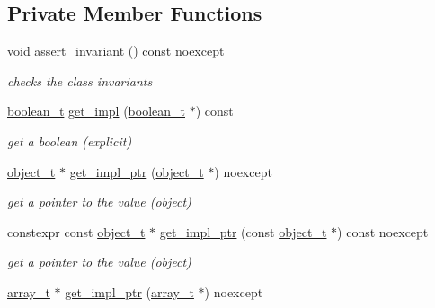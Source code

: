 \subsection*{Private Member Functions}
\begin{DoxyCompactItemize}
\item 
void \hyperlink{classnlohmann_1_1basic__json_a4a82d3fb7a111641decf35c2fb707c7f}{assert\+\_\+invariant} () const noexcept
\begin{DoxyCompactList}\small\item\em checks the class invariants \end{DoxyCompactList}\item 
\hyperlink{classnlohmann_1_1basic__json_a4c919102a9b4fe0d588af64801436082}{boolean\+\_\+t} \hyperlink{classnlohmann_1_1basic__json_ac686d87a2261f85f1df97035b14a6e3a}{get\+\_\+impl} (\hyperlink{classnlohmann_1_1basic__json_a4c919102a9b4fe0d588af64801436082}{boolean\+\_\+t} $\ast$) const
\begin{DoxyCompactList}\small\item\em get a boolean (explicit) \end{DoxyCompactList}\item 
\hyperlink{classnlohmann_1_1basic__json_a5e48a7893520e1314bf0c9723e26ea2a}{object\+\_\+t} $\ast$ \hyperlink{classnlohmann_1_1basic__json_a58b65f595883fb93333423ec5e3bafee}{get\+\_\+impl\+\_\+ptr} (\hyperlink{classnlohmann_1_1basic__json_a5e48a7893520e1314bf0c9723e26ea2a}{object\+\_\+t} $\ast$) noexcept
\begin{DoxyCompactList}\small\item\em get a pointer to the value (object) \end{DoxyCompactList}\item 
constexpr const \hyperlink{classnlohmann_1_1basic__json_a5e48a7893520e1314bf0c9723e26ea2a}{object\+\_\+t} $\ast$ \hyperlink{classnlohmann_1_1basic__json_aff66aa31ef8603d799433b26fe7535c9}{get\+\_\+impl\+\_\+ptr} (const \hyperlink{classnlohmann_1_1basic__json_a5e48a7893520e1314bf0c9723e26ea2a}{object\+\_\+t} $\ast$) const noexcept
\begin{DoxyCompactList}\small\item\em get a pointer to the value (object) \end{DoxyCompactList}\item 
\hyperlink{classnlohmann_1_1basic__json_ae095578e03df97c5b3991787f1056374}{array\+\_\+t} $\ast$ \hyperlink{classnlohmann_1_1basic__json_a0a9c36d4d94ef5d611c0204bc7e4d37f}{get\+\_\+impl\+\_\+ptr} (\hyperlink{classnlohmann_1_1basic__json_ae095578e03df97c5b3991787f1056374}{array\+\_\+t} $\ast$) noexcept

\end{DoxyCompactItemize}
